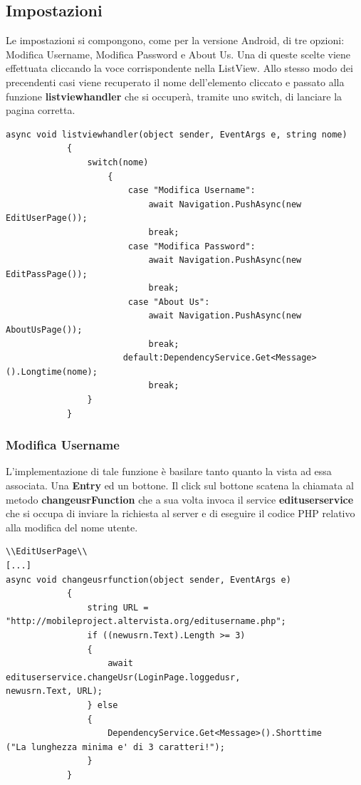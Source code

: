 \documentclass[a4paper, 50pt, twoside]{article}
\begin{document}
\subsection{Impostazioni}
Le impostazioni si compongono, come per la versione Android, di tre opzioni: Modifica Username, Modifica Password e About Us. Una di queste scelte viene effettuata cliccando la voce corrispondente nella ListView. Allo stesso modo dei precendenti casi viene recuperato il nome dell'elemento cliccato e passato alla funzione \textbf{listviewhandler} che si occuperà, tramite uno switch, di lanciare la pagina corretta.
\begin{lstlisting}
async void listviewhandler(object sender, EventArgs e, string nome)
            {
                switch(nome)
                    {
                        case "Modifica Username":
                            await Navigation.PushAsync(new EditUserPage());
                            break;
                        case "Modifica Password":
                            await Navigation.PushAsync(new EditPassPage());
                            break;
                        case "About Us":
                            await Navigation.PushAsync(new AboutUsPage());
                            break;
                       default:DependencyService.Get<Message>().Longtime(nome);
                            break;
                }
            }
\end{lstlisting}
\subsubsection{Modifica Username}
L'implementazione di tale funzione è basilare tanto quanto la vista ad essa associata. Una \textbf{Entry} ed un bottone. Il click sul bottone scatena la chiamata al metodo \textbf{changeusrFunction} che a sua volta invoca il service \textbf{edituserservice} che si occupa di inviare la richiesta al server e di eseguire il codice PHP relativo alla modifica del nome utente.
\begin{lstlisting}
\\EditUserPage\\
[...]
async void changeusrfunction(object sender, EventArgs e)
            {
                string URL = 
"http://mobileproject.altervista.org/editusername.php";
                if ((newusrn.Text).Length >= 3)
                {
                    await edituserservice.changeUsr(LoginPage.loggedusr, 
newusrn.Text, URL);
                } else
                {
                    DependencyService.Get<Message>().Shorttime
("La lunghezza minima e' di 3 caratteri!");
                }
            }
\end{lstlisting} 
\end{document}
